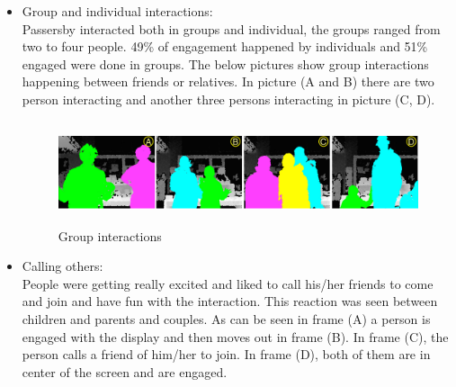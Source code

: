 \begin{enumerate}
\begin{itemize}
\item Group and individual interactions: \\
Passersby interacted both in groups and individual, the groups ranged from two to four people. 49\% of engagement happened by individuals and 51\% engaged were done in groups. 
The below pictures show group interactions happening between friends or relatives. In picture (A and B) there are two person interacting and another three persons interacting in picture (C, D).


\begin{minipage}{0.89\textwidth}
\begin{flushright}
\begin{figure}[H]
    \centering
    \includegraphics[width=\textwidth,height=30mm]{Figures/8/body_inter_findings/effects/group}
    \caption{Group interactions}
    \label{fig:group_interaction}
\end{figure}
\end{flushright}
\end{minipage}







\item Calling others: \\
People were getting really excited and liked to call his/her friends to come and join and have fun with the interaction. This reaction was seen between children and parents and couples. As can be seen in frame (A) a person is engaged with the display and then moves out in frame (B). In frame (C), the person calls a friend of him/her to join. In frame (D), both of them are in center of the screen and are engaged.



\end{itemize}
\end{enumerate}
